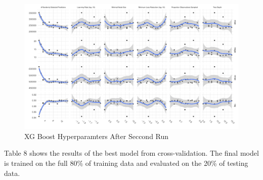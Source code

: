 \documentclass[
]{article}
\begin{document}
\begin{figure}
\centering
\includegraphics{final_report_files/figure-latex/unnamed-chunk-34-1.pdf}
\caption{XG Boost Hyperparamters After Seccond Run}
\end{figure}

Table 8 shows the results of the best model from cross-validation. The
final model is trained on the full 80\% of training data and evaluated
on the 20\% of testing data.
\end{document}
